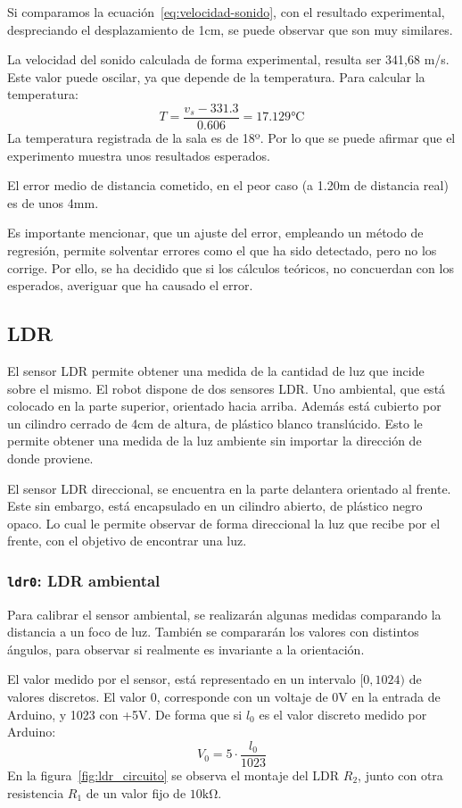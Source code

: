 \documentclass[10pt,a4paper,hidelinks,twocolumn]{article}
\begin{document}
Si comparamos la ecuación~\ref{eq:velocidad-sonido}, con el resultado 
experimental, despreciando el desplazamiento de 1cm, se puede observar que son 
muy similares.

La velocidad del sonido calculada de forma experimental, resulta ser 341,68 m/s.  
Este valor puede oscilar, ya que depende de la temperatura. Para calcular la 
temperatura:
$$ T = \frac{v_{s}-331.3}{0.606} = 17.129 \si{\celsius} $$
La temperatura registrada de la sala es de 18º. Por lo que se puede afirmar que 
el experimento muestra unos resultados esperados.

El error medio de distancia cometido, en el peor caso (a 1.20m de distancia 
real) es de unos 4mm.

Es importante mencionar, que un ajuste del error, empleando un método de 
regresión, permite solventar errores como el que ha sido detectado, pero no los 
corrige. Por ello, se ha decidido que si los cálculos teóricos, no concuerdan 
con los esperados, averiguar que ha causado el error.

\subsection{LDR}

El sensor LDR permite obtener una medida de la cantidad de luz que incide sobre 
el mismo. El robot dispone de dos sensores LDR. Uno ambiental, que está colocado 
en la parte superior, orientado hacia arriba. Además está cubierto por un 
cilindro cerrado de 4cm de altura, de plástico blanco translúcido. Esto le 
permite obtener una medida de la luz ambiente sin importar la dirección de donde 
proviene.

El sensor LDR direccional, se encuentra en la parte delantera orientado al 
frente. Este sin embargo, está encapsulado en un cilindro abierto, de plástico 
negro opaco. Lo cual le permite observar de forma direccional la luz que recibe 
por el frente, con el objetivo de encontrar una luz.

\subsubsection{\texttt{ldr0}: LDR ambiental}

Para calibrar el sensor ambiental, se realizarán algunas medidas comparando la 
distancia a un foco de luz. También se compararán los valores con distintos 
ángulos, para observar si realmente es invariante a la orientación.

El valor medido por el sensor, está representado en un intervalo $[0, 1024)$ de 
valores discretos. El valor 0, corresponde con un voltaje de 0V en la entrada de 
Arduino, y 1023 con +5V. De forma que si $l_0$ es el valor discreto medido por 
Arduino:
$$ V_0 = 5 \cdot \frac{l_0}{1023} $$
En la figura~\ref{fig:ldr_circuito} se observa el montaje del LDR $R_2$, junto 
con otra resistencia $R_1$ de un valor fijo de $10\si{\kohm}$.
\end{document}
